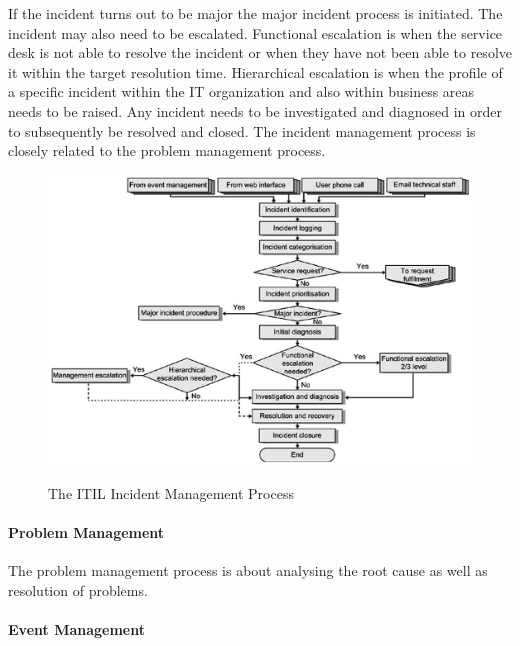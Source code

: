 If the incident turns out to be major the major incident process is initiated. The incident may also need to be escalated. Functional escalation is when the service desk is not able to resolve the incident or when they have not been able to resolve it within the target resolution time. Hierarchical escalation is when the profile of a specific incident within the IT organization and also within business areas needs to be raised. Any incident needs to be investigated and diagnosed in order to subsequently be resolved and closed. The incident management process is closely related to the problem management process.

\begin{figure}
\centering
\scalebox{0.48}
{\includegraphics{ITILIncidentManagement.png}}
\caption[[The ITIL Incident Management Process]{The ITIL Incident Management Process \cite{itilbok}} 
\label{fig:ITILIncidentManagement}
\end{figure}

\paragraph{Problem Management}
The problem management process is about analysing the root cause as well as resolution of problems.

\paragraph{Event Management}
